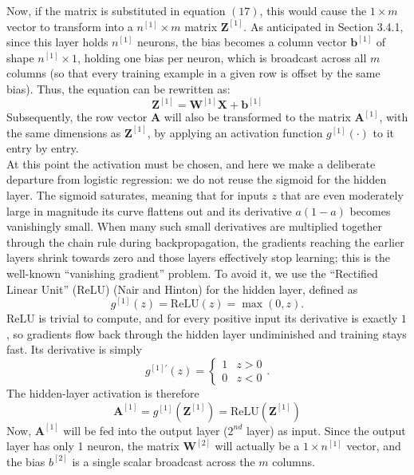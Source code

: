 \documentclass{article}
\begin{document}
Now, if the matrix is substituted in equation $(17)$, this would cause the $1 \times m$ vector to transform into a $n^{[1]} \times m$ matrix $\mathbf{Z}^{[1]}$. As anticipated in Section 3.4.1, since this layer holds $n^{[1]}$ neurons, the bias becomes a column vector $\mathbf{b}^{[1]}$ of shape $n^{[1]} \times 1$, holding one bias per neuron, which is broadcast across all $m$ columns (so that every training example in a given row is offset by the same bias). Thus, the equation can be rewritten as:
\begin{equation}
    \mathbf{Z}^{[1]}=\mathbf{W}^{[1]}\mathbf{X} + \mathbf{b}^{[1]}
\end{equation}
Subsequently, the row vector $\mathbf{A}$ will also be transformed to the matrix $\mathbf{A}^{[1]}$, with the same dimensions as $\mathbf{Z}^{[1]}$, by applying an activation function $g^{[1]}(\cdot)$ to it entry by entry.
\\
At this point the activation must be chosen, and here we make a deliberate departure from logistic regression: we do not reuse the sigmoid for the hidden layer. The sigmoid saturates, meaning that for inputs $z$ that are even moderately large in magnitude its curve flattens out and its derivative $a(1-a)$ becomes vanishingly small. When many such small derivatives are multiplied together through the chain rule during backpropagation, the gradients reaching the earlier layers shrink towards zero and those layers effectively stop learning; this is the well-known ``vanishing gradient'' problem. To avoid it, we use the ``Rectified Linear Unit'' (ReLU) (Nair and Hinton) for the hidden layer, defined as
$$g^{[1]}(z) = \text{ReLU}(z) = \max(0, z).$$
ReLU is trivial to compute, and for every positive input its derivative is exactly $1$, so gradients flow back through the hidden layer undiminished and training stays fast. Its derivative is simply
$$g^{[1]\prime}(z) = \begin{cases} 1 & z > 0 \\ 0 & z < 0 \end{cases}.$$
The hidden-layer activation is therefore
\begin{equation}
    \mathbf{A}^{[1]}=g^{[1]}(\mathbf{Z}^{[1]})=\text{ReLU}(\mathbf{Z}^{[1]})
\end{equation}
Now, $\mathbf{A}^{[1]}$ will be fed into the output layer ($2^{nd}$ layer) as input. Since the output layer has only 1 neuron, the matrix $\mathbf{W}^{[2]}$ will actually be a $1 \times n^{[1]}$ vector, and the bias $b^{[2]}$ is a single scalar broadcast across the $m$ columns.
\end{document}
